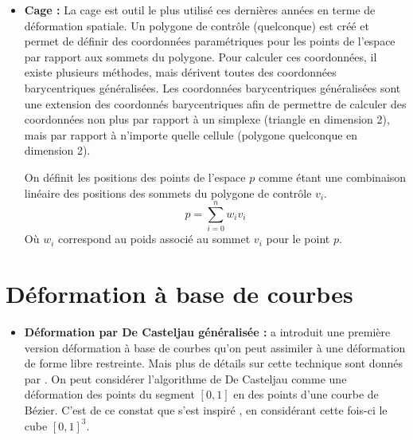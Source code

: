 \begin{itemize}
\item{\textbf{Cage :}} La cage est outil le plus utilisé ces dernières
  années en terme de déformation spatiale. Un polygone de contrôle
  (quelconque) est créé et permet de définir des coordonnées
  paramétriques pour les points de l'espace par rapport aux sommets du
  polygone. Pour calculer ces coordonnées, il existe plusieurs
  méthodes, mais dérivent toutes des coordonnées barycentriques
  généralisées. Les coordonnées barycentriques généralisées sont une
  extension des coordonnés barycentriques afin de permettre de
  calculer des coordonnées non plus par rapport à un simplexe
  (triangle en dimension 2), mais par rapport à n'importe quelle
  cellule (polygone quelconque en dimension 2).

  On définit les positions des points de l'espace $p$ comme étant une
  combinaison linéaire des positions des sommets du polygone de
  contrôle $v_i$.
  \begin{equation}
    p = \sum_{i=0}^n w_iv_i
  \end{equation}
  Où $w_i$ correspond au poids associé au sommet $v_i$ pour le point
  $p$.
\end{itemize}

\section{Déformation à base de courbes}
\begin{itemize}
\item{\textbf{Déformation par De Casteljau généralisée :}} \cite{CR94}
  a introduit une première version déformation à base de courbes qu'on
  peut assimiler à une déformation de forme libre restreinte. Mais
  plus de détails sur cette technique sont donnés par \cite{BE01}.  On
  peut considérer l'algorithme de De Casteljau comme une déformation
  des points du segment $[0,1]$ en des points d'une courbe de
  Bézier. C'est de ce constat que s'est inspiré \cite{CR94}, en
  considérant cette fois-ci le cube $[0,1]^3$.
\end{itemize}

